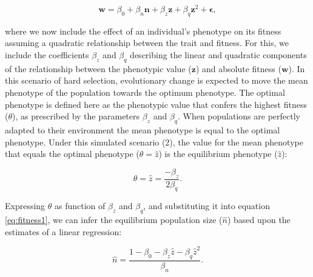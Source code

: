 \documentclass{article}
\begin{document}
\begin{equation} \label{eq:fitness1}
\bm{w}=\beta_{0} +\beta_{n} \bm{n} + \beta_{z} \bm{z} + \beta_{q} \bm{z}^2 +  \bm{\epsilon},
\end{equation}

\noindent where we now include the effect of an individual's phenotype on its fitness assuming a quadratic relationship between the trait and fitness. For this, we include the coefficients $\beta_{z}$ and $\beta_{q}$ describing the linear and quadratic components of the relationship between the phenotypic value ($\bm{z}$) and absolute fitness ($\bm{w}$). In this scenario of hard selection, evolutionary change is expected to move the mean phenotype of the population towards the optimum phenotype. The optimal phenotype is defined here as the phenotypic value that confers the highest fitness ($\theta$), as prescribed by the parameters $\beta_{z}$ and $\beta_{q}$. When populations are perfectly adapted to their environment the mean phenotype is equal to the optimal phenotype. Under this simulated scenario (2), the value for the mean phenotype that equals the optimal phenotype ($\theta=\hat{z}$) is the equilibrium phenotype ($\hat{z}$):
 
\begin{equation}
\theta=\hat{z}=\frac{-\beta_{z}}{2\beta_{q}}.
\end{equation}

\noindent Expressing $\theta$ as function of $\beta_{z}$ and $\beta_{q}$, and substituting it into equation \ref{eq:fitness1}, we can infer the equilibrium population size ($\hat{n}$) based upon the estimates of a linear regression:

\begin{equation}\label{eq:equilibrium1}
\hat{n}=\frac{1-\beta_{0}- \beta_{z}\hat{z} - \beta_{q}\hat{z}^2}{\beta_n}. 
\end{equation}
\end{document}
